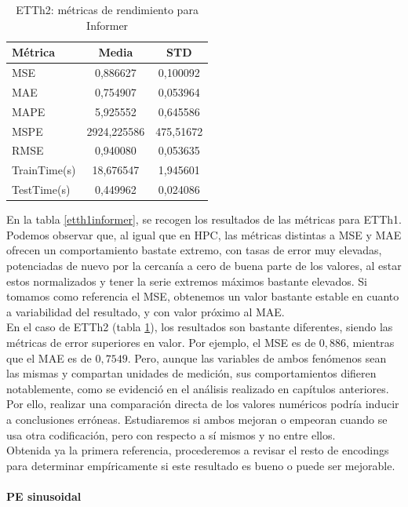 \begin{table}[!ht]
	\centering
	\begin{tabular}{l|c|c}
		\toprule
		Métrica & Media & STD \\
		\midrule
		MSE & 0,886627 & 0,100092 \\
		MAE & 0,754907 & 0,053964 \\
		MAPE & 5,925552 & 0,645586 \\
		MSPE & 2924,225586 & 475,51672 \\
		RMSE & 0,940080
		 & 0,053635 \\
		TrainTime(s) & 18,676547 & 1,945601 \\
		TestTime(s) & 0,449962 & 0,024086 \\
		\bottomrule
	\end{tabular}
	\caption{ETTh2: métricas de rendimiento para Informer}
	\label{etth2informer}
\end{table}




En la tabla \ref{etth1informer}, se recogen los resultados de las métricas para ETTh1. Podemos observar que, al igual que en HPC, las métricas distintas a MSE y MAE ofrecen un comportamiento bastate extremo, con tasas de error muy elevadas, potenciadas de nuevo por la cercanía a cero de buena parte de los valores, al estar estos normalizados y tener la serie extremos máximos bastante elevados. Si tomamos como referencia el MSE, obtenemos un valor bastante estable en cuanto a variabilidad del resultado, y con valor próximo al MAE.\\

En el caso de ETTh2 (tabla \ref{etth2informer}), los resultados son bastante diferentes, siendo las métricas de error superiores en valor. Por ejemplo, el MSE es de $0,886$, mientras que el MAE es de $0,7549$. Pero, aunque las variables de ambos fenómenos sean las mismas y compartan unidades de medición, sus comportamientos difieren notablemente, como se evidenció en el análisis realizado en capítulos anteriores. Por ello, realizar una comparación directa de los valores numéricos podría inducir a conclusiones erróneas. Estudiaremos si ambos mejoran o empeoran cuando se usa otra codificación, pero con respecto a sí mismos y no entre ellos.\\

Obtenida ya la primera referencia, procederemos a revisar el resto de encodings para determinar empíricamente si este resultado es bueno o puede ser mejorable.
 
 
\paragraph{PE sinusoidal}
 
